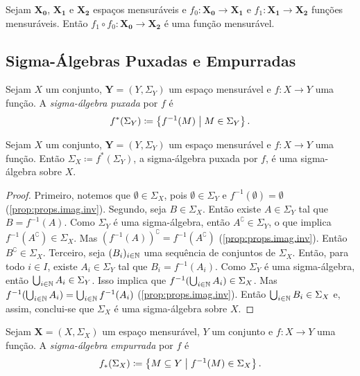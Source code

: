 \begin{prop}
Sejam $\bm{X_0}$, $\bm{X_1}$ e $\bm{X_2}$ espaços mensuráveis e $f_0: \bm{X_0} \to \bm{X_1}$ e $f_1: \bm{X_1} \to \bm{X_2}$ funções mensuráveis. Então $f_1 \circ f_0: \bm{X_0} \to \bm{X_2}$ é uma função mensurável.
\end{prop}

\subsection{Sigma-Álgebras Puxadas e Empurradas}

\begin{defi}
Sejam $X$ um conjunto, $\bm Y = (Y,\Sigma_Y)$ um espaço mensurável e $f: X \to Y$ uma função. A \emph{sigma-álgebra puxada} por $f$ é
	\begin{equation*}
	f^*(\Sigma_Y) \coloneqq \left\{f^{-1}(M) \;\middle\vert\; M \in \Sigma_Y \right\}.
	\end{equation*}
\end{defi}

\begin{prop}
Sejam $X$ um conjunto, $\bm Y = (Y,\Sigma_Y)$ um espaço mensurável e $f: X \to Y$ uma função. Então $\Sigma_X \coloneqq f^*(\Sigma_Y)$, a sigma-álgebra puxada por $f$, é uma sigma-álgebra sobre $X$.
\end{prop}
\begin{proof}
Primeiro, notemos que $\emptyset \in \Sigma_X$, pois $\emptyset \in \Sigma_Y$ e $f^{-1}(\emptyset) = \emptyset$ (\ref{prop:props.imag.inv}). Segundo, seja $B \in \Sigma_X$. Então existe $A \in \Sigma_Y$ tal que $B = f^{-1}(A)$. Como $\Sigma_Y$ é uma sigma-álgebra, então $A^\complement \in \Sigma_Y$, o que implica $f^{-1}(A^\complement) \in \Sigma_X$. Mas $(f^{-1}(A))^\complement = f^{-1}(A^\complement)$ (\ref{prop:props.imag.inv}). Então $B^\complement \in \Sigma_X$. Terceiro, seja $(B_i)_{i \in \mathbb{N}}$ uma sequência de conjuntos de $\Sigma_X$. Então, para todo $i \in I$, existe $A_i \in \Sigma_Y$ tal que $B_i = f^{-1}(A_i)$. Como $\Sigma_Y$ é uma sigma-álgebra, então $\bigcup_{i \in \mathbb{N}} A_i \in \Sigma_Y$. Isso implica que $f^{-1}(\bigcup_{i \in \mathbb{N}} A_i) \in \Sigma_X$. Mas $f^{-1}(\bigcup_{i \in \mathbb{N}} A_i) = \bigcup_{i \in \mathbb{N}} f^{-1}(A_i)$ (\ref{prop:props.imag.inv}). Então $\bigcup_{i \in \mathbb{N}} B_i \in \Sigma_X$ e, assim, conclui-se que $\Sigma_X$ é uma sigma-álgebra sobre $X$.
\end{proof}

\begin{defi}
Sejam $\bm X = (X,\Sigma_X)$ um espaço mensurável, $Y$ um conjunto e $f: X \to Y$ uma função. A \emph{sigma-álgebra empurrada} por $f$ é
	\begin{equation*}
	f_*(\Sigma_X) \coloneqq \left\{M \subseteq Y \;\middle\vert\; f^{-1}(M) \in \Sigma_X \right\}.
	\end{equation*}
\end{defi}

